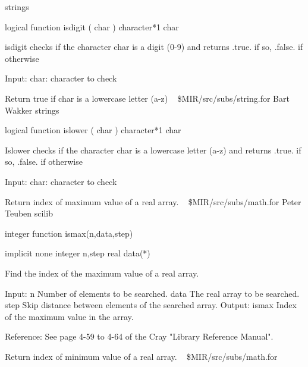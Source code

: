 \newline {} strings
\par{\tenpoint
{\eightpoint\begintt
      logical function isdigit ( char )
      character*1 char

 isdigit checks if the character char is a digit (0-9) and returns .true. if
 so, .false. if otherwise

 Input:
   char:    character to check
\endtt}
\par}
%
\noindent Return true if char is a lowercase letter (a-z)
\newline \ 
\newline {} \$MIR/src/subs/string.for
\newline {} Bart Wakker
\newline {} strings
\par{\tenpoint
{\eightpoint\begintt
      logical function islower ( char )
      character*1 char

 Islower checks if the character char is a lowercase letter (a-z) and returns
 .true. if so, .false. if otherwise

 Input:
   char:    character to check
\endtt}
\par}
%
\noindent Return index of maximum value of a real array.
\newline \ 
\newline {} \$MIR/src/subs/math.for
\newline {} Peter Teuben
\newline \abox{Keywords:} scilib
\par{\tenpoint
{\eightpoint\begintt
        integer function ismax(n,data,step)

        implicit none
        integer n,step
        real data(*)

  Find the index of the maximum value of a real array.

  Input:
    n          Number of elements to be searched.
    data       The real array to be searched.
    step       Skip distance between elements of the searched array.
  Output:
    ismax      Index of the maximum value in the array.

  Reference:
  See page 4-59 to 4-64 of the Cray "Library Reference Manual".
\endtt}
\par}
%
\noindent Return index of minimum value of a real array.
\newline \ 
\newline {} \$MIR/src/subs/math.for
